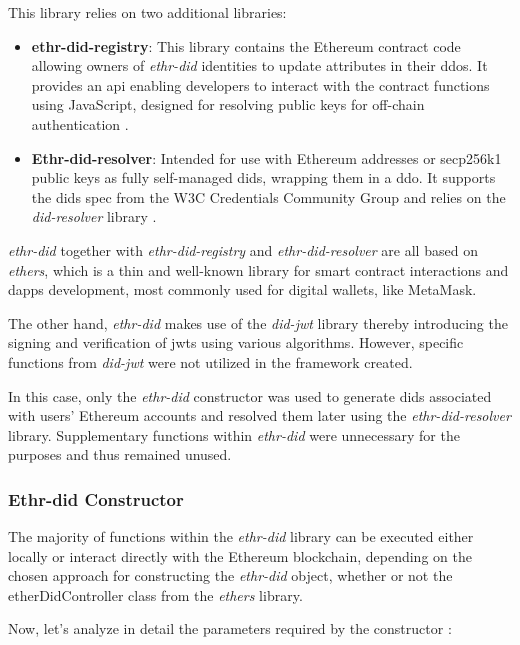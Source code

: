 This library relies on two additional libraries: 

\begin{itemize}
  \item \textbf{ethr-did-registry}: This library contains the Ethereum contract code allowing owners of \textit{ethr-did} identities to update attributes in their \gls{ddo}s. 
  It provides an \gls{api} enabling developers to interact with the contract functions using JavaScript, designed for resolving public keys for off-chain authentication \cite{ethr-did-registry}.
  \item \textbf{Ethr-did-resolver}: Intended for use with Ethereum addresses or secp256k1 public keys as fully self-managed \gls{did}s, wrapping them in a \gls{ddo}. It 
  supports the \gls{did}s spec from the W3C Credentials Community Group and relies on the \textit{did-resolver} library \cite{ethr-did-resolver}.
\end{itemize}

\textit{ethr-did} together with \textit{ethr-did-registry} and \textit{ethr-did-resolver} are all based on \textit{ethers}, which is a thin and well-known library for smart contract interactions and 
\gls{dapp}s development, most commonly used for digital wallets, like MetaMask.

The other hand, \textit{ethr-did} makes use of the \textit{did-jwt} library thereby introducing the signing and verification of \gls{jwt}s using various algorithms. However, specific 
functions from \textit{did-jwt} were not utilized in the framework created. 

In this case, only the \textit{ethr-did} constructor was used to generate \gls{did}s associated with users' Ethereum accounts and resolved them later using the \textit{ethr-did-resolver} library. 
Supplementary functions within \textit{ethr-did} were unnecessary for the purposes and thus remained unused.

\subsubsection{Ethr-did Constructor}

The majority of functions within the \textit{ethr-did} library can be executed either locally or interact directly with the Ethereum blockchain, depending on the chosen approach for 
constructing the \textit{ethr-did} object, whether or not the etherDidController class from the \textit{ethers} library. 

Now, let's analyze in detail the parameters required by the constructor \cite{ethr-did}: 

